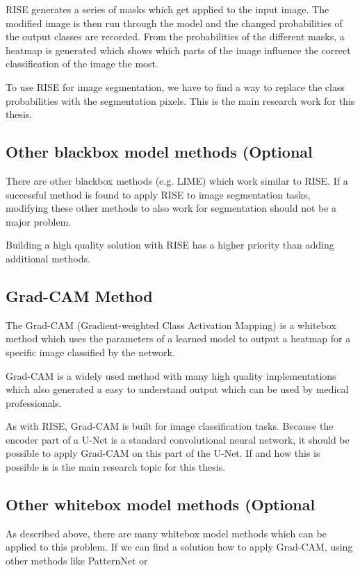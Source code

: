 RISE generates a series of masks which get applied to the input image. The modified image is then run through the model and the changed probabilities of the output classes are recorded. From the probabilities of the different masks, a heatmap is generated which shows which parts of the image influence the correct classification of the image the most.

To use RISE for image segmentation, we have to find a way to replace the class probabilities with the segmentation pixels. This is the main research work for this thesis.

\subsection{Other blackbox model methods (Optional}
There are other blackbox methods (e.g. LIME\cite{ribeiro2016should}) which work similar to RISE. If a successful method is found to apply RISE to image segmentation tasks, modifying these other methods to also work for segmentation should not be a major problem.

Building a high quality solution with RISE has a higher priority than adding additional methods.

\subsection{Grad-CAM Method}
The Grad-CAM\cite{selvaraju2017grad} (Gradient-weighted Class Activation Mapping) is a whitebox method which uses the parameters of a learned model to output a heatmap for a specific image classified by the network.

Grad-CAM is a widely used method with many high quality implementations which also generated a easy to understand output which can be used by medical professionals.

As with RISE, Grad-CAM is built for image classification tasks. Because the encoder part of a U-Net is a standard convolutional neural network, it should be possible to apply Grad-CAM on this part of the U-Net. If and how this is possible is is the main research topic for this thesis.

\subsection{Other whitebox model methods (Optional}
As described above, there are many whitebox model methods which can be applied to this problem. If we can find a solution how to apply Grad-CAM, using other methods like PatternNet or 

